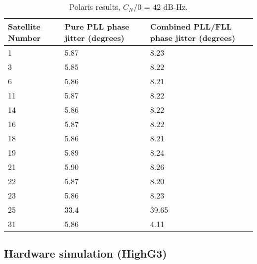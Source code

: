 \begin{table}[!htb]
\centering
\begin{tabular}{|l|l|l|}
\hline
\rowcolor[HTML]{C0C0C0} 
Satellite Number & Pure PLL phase jitter (degrees) & Combined PLL/FLL phase jitter (degrees) \\ \hline
1                & 5.87                            & 8.23                                    \\ \hline
\rowcolor[HTML]{EFEFEF} 
3                & 5.85                            & 8.22                                    \\ \hline
6                & 5.86                            & 8.21                                    \\ \hline
\rowcolor[HTML]{EFEFEF} 
11               & 5.87                            & 8.22                                    \\ \hline
14               & 5.86                            & 8.22                                    \\ \hline
\rowcolor[HTML]{EFEFEF} 
16               & 5.87                            & 8.22                                    \\ \hline
18               & 5.86                            & 8.21                                    \\ \hline
\rowcolor[HTML]{EFEFEF} 
19               & 5.89                            & 8.24                                    \\ \hline
21               & 5.90                            & 8.26                                    \\ \hline
\rowcolor[HTML]{EFEFEF} 
22               & 5.87                            & 8.20                                    \\ \hline
23               & 5.86                            & 8.23                                    \\ \hline
\rowcolor[HTML]{EFEFEF} 
25               & 33.4                            & 39.65                                   \\ \hline
31               & 5.86                            & 4.11                                    \\ \hline
\end{tabular}
\caption{Polaris results, $C_N/0$ = 42 dB-Hz.}
\label{tab:PolarisResultsCNO42}
\end{table}

\clearpage
\subsection{Hardware simulation (HighG3)}

